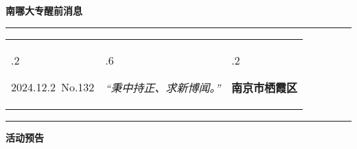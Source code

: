\documentclass[letterpaper, 12pt]{article}
\begin{document}
\begin{center}
    \Huge\textbf{南哪大专醒前消息}
\end{center}
\vspace{4mm}
\hrule
\renewcommand\tabularxcolumn[1]{m{#1}}
\begin{tabularx}{\textwidth}{>{\hsize.2\hsize}X>{\hsize.6\hsize}X>{\hsize.2\hsize}X}
    \begin{flushleft}
        2024.12.2\, No.132
    \end{flushleft}
    &
    \begin{center}
        \textit{“秉中持正、求新博闻。”}
    \end{center}
    &
    \begin{flushright}
        \textbf{南京市栖霞区}
    \end{flushright}
\end{tabularx}
\vspace{-3.5mm}
\hrule
\vspace{4mm}
\centerline{\huge\textbf{活动预告}}
\end{document}
